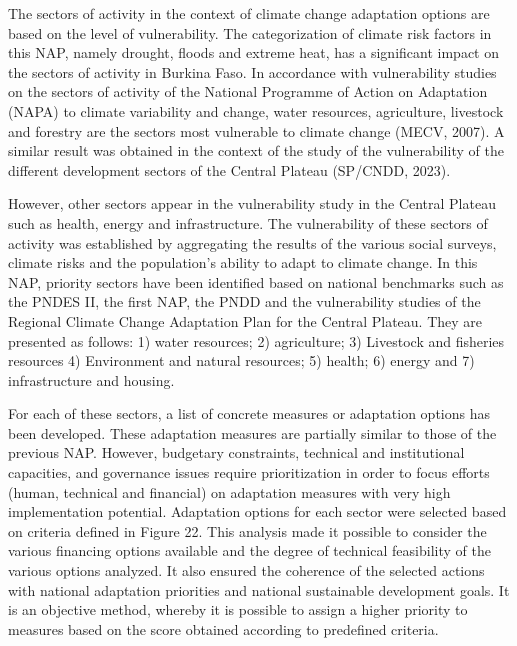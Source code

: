 \documentclass[
]{book}
\begin{document}
The sectors of activity in the context of climate change adaptation options are based on the level of vulnerability. The categorization of climate risk factors in this NAP, namely drought, floods and extreme heat, has a significant impact on the sectors of activity in Burkina Faso. In accordance with vulnerability studies on the sectors of activity of the National Programme of Action on Adaptation (NAPA) to climate variability and change, water resources, agriculture, livestock and forestry are the sectors most vulnerable to climate change (MECV, 2007). A similar result was obtained in the context of the study of the vulnerability of the different development sectors of the Central Plateau (SP/CNDD, 2023).

However, other sectors appear in the vulnerability study in the Central Plateau such as health, energy and infrastructure. The vulnerability of these sectors of activity was established by aggregating the results of the various social surveys, climate risks and the population's ability to adapt to climate change. In this NAP, priority sectors have been identified based on national benchmarks such as the PNDES II, the first NAP, the PNDD and the vulnerability studies of the Regional Climate Change Adaptation Plan for the Central Plateau. They are presented as follows: 1) water resources; 2) agriculture; 3) Livestock and fisheries resources 4) Environment and natural resources; 5) health; 6) energy and 7) infrastructure and housing.

For each of these sectors, a list of concrete measures or adaptation options has been developed. These adaptation measures are partially similar to those of the previous NAP. However, budgetary constraints, technical and institutional capacities, and governance issues require prioritization in order to focus efforts (human, technical and financial) on adaptation measures with very high implementation potential. Adaptation options for each sector were selected based on criteria defined in Figure 22. This analysis made it possible to consider the various financing options available and the degree of technical feasibility of the various options analyzed. It also ensured the coherence of the selected actions with national adaptation priorities and national sustainable development goals. It is an objective method, whereby it is possible to assign a higher priority to measures based on the score obtained according to predefined criteria.
\end{document}
